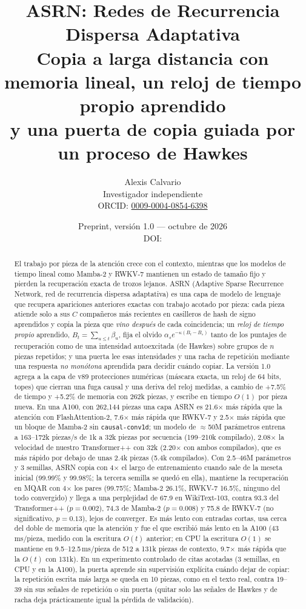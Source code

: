 \documentclass[11pt]{article}
\title{\textbf{ASRN: Redes de Recurrencia Dispersa Adaptativa}\\[4pt]
\large Copia a larga distancia con memoria lineal, un reloj de tiempo propio aprendido\\ y una puerta de copia
guiada por un proceso de Hawkes}
\author{Alexis Calvario\\ \small Investigador independiente\\ \small ORCID: \href{https://orcid.org/0009-0004-0854-6398}{0009-0004-0854-6398}}
\date{\small Preprint, versión 1.0 --- octubre de 2026%
\ifx\zenododoi\empty\else\\ DOI: \href{https://doi.org/\zenododoi}{\zenododoi}\fi}
\begin{document}
\maketitle

\begin{abstract}
\noindent El trabajo por pieza de la atención crece con el contexto, mientras que los modelos de tiempo lineal como
Mamba-2 y RWKV-7 mantienen un estado de tamaño fijo y pierden la recuperación exacta de trozos lejanos. ASRN (Adaptive
Sparse Recurrence Network, red de recurrencia dispersa adaptativa) es una capa de modelo de lenguaje que recupera
apariciones anteriores exactas con trabajo acotado por pieza: cada pieza atiende solo a sus $C$ compañeros más recientes
en casilleros de hash de signo aprendidos y copia la pieza que \emph{vino después} de cada coincidencia; un \emph{reloj
de tiempo propio} aprendido, $B_t=\sum_{u\le t}\beta_u$, fija el olvido $\alpha_s e^{-\kappa(B_t-B_s)}$ tanto de los
puntajes de recuperación como de una intensidad autoexcitada (de Hawkes) sobre grupos de $n$ piezas repetidos; y una
puerta lee esas intensidades y una racha de repetición mediante una respuesta \emph{no monótona} aprendida para decidir
cuándo copiar. La versión 1.0 agrega a la capa de v89 protecciones numéricas (máscara exacta, un reloj de 64 bits,
topes) que cierran una fuga causal y una deriva del reloj medidas, a cambio de +7.5\% de tiempo y +5.2\% de memoria con
262k piezas, y escribe en tiempo $O(1)$ por pieza nueva. En una A100, con 262{,}144 piezas una capa ASRN es 21.6$\times$
más rápida que la atención con FlashAttention-2, 7.6$\times$ más rápida que RWKV-7 y 2.5$\times$ más rápida que un
bloque de Mamba-2 sin \texttt{causal-conv1d}; un modelo de $\approx$50M parámetros entrena a 163--172k piezas/s de 1k a
32k piezas por secuencia (199--210k compilado), 2.08$\times$ la velocidad de nuestro Transformer++ con 32k (2.20$\times$
con ambos compilados), que es más rápido por debajo de unas 2.4k piezas (5.4k compilados). Con 2.5--46M parámetros y 3
semillas, ASRN copia con 4$\times$ el largo de entrenamiento cuando sale de la meseta inicial (99.99\% y 99.98\%; la
tercera semilla se quedó en ella), mantiene la recuperación en MQAR con 4$\times$ los pares (99.75\%; Mamba-2 26.1\%,
RWKV-7 16.5\%, ninguno del todo convergido) y llega a una perplejidad de 67.9 en WikiText-103, contra 93.3 del
Transformer++ ($p=0.002$), 74.3 de Mamba-2 ($p=0.008$) y 75.8 de RWKV-7 (no significativo, $p=0.13$), lejos de
converger. Es más lento con entradas cortas, usa cerca del doble de memoria que la atención y fue el que escribió más
lento en la A100 (43\,ms/pieza, medido con la escritura $O(t)$ anterior; en CPU la escritura $O(1)$ se mantiene en
9.5--12.5\,ms/pieza de 512 a 131k piezas de contexto, 9.7$\times$ más rápida que la $O(t)$ con 131k). En un experimento
controlado de citas acotadas (3 semillas, en CPU y en la A100), la puerta aprende sin supervisión explícita cuándo dejar
de copiar: la repetición escrita más larga se queda en 10 piezas, como en el texto real, contra 19--39 sin sus señales
de repetición o sin puerta (quitar solo las señales de Hawkes y de racha deja prácticamente igual la pérdida de
validación).
\end{abstract}
\end{document}
